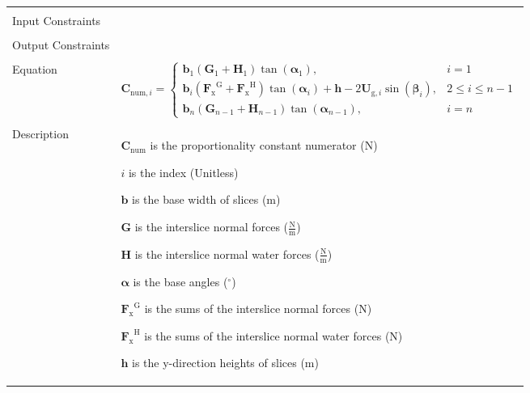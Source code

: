 \documentclass[12pt]{article}
\begin{document}
\begin{minipage}{\textwidth}
\begin{tabular}{>{\raggedright}p{}>{\raggedright\arraybackslash}p{}}
\\ \midrule \\
Input Constraints & 
\\ \midrule \\
Output Constraints & 
\\ \midrule \\
Equation & \begin{displaymath}
           {\mathbf{C}_{\text{num},i}}=\begin{cases}
                                       {\mathbf{b}}_{1} \left({\mathbf{G}}_{1}+{\mathbf{H}}_{1}\right) \tan\left({\mathbf{α}}_{1}\right), & i=1\\
                                       {\mathbf{b}}_{i} \left({{\mathbf{F}_{\text{x}}}^{\text{G}}}+{{\mathbf{F}_{\text{x}}}^{\text{H}}}\right) \tan\left({\mathbf{α}}_{i}\right)+\mathbf{h} -2 {\mathbf{U}_{\text{g},i}} \sin\left({\mathbf{β}}_{i}\right), & 2\leq{}i\leq{}n-1\\
                                       {\mathbf{b}}_{n} \left({\mathbf{G}}_{n-1}+{\mathbf{H}}_{n-1}\right) \tan\left({\mathbf{α}}_{n-1}\right), & i=n
                                       \end{cases}
           \end{displaymath}
\\ \midrule \\
Description & \begin{symbDescription}
              \item{${\mathbf{C}_{\text{num}}}$ is the proportionality constant numerator (N)}
              \item{$i$ is the index (Unitless)}
              \item{$\mathbf{b}$ is the base width of slices (m)}
              \item{$\mathbf{G}$ is the interslice normal forces ($\frac{\text{N}}{\text{m}}$)}
              \item{$\mathbf{H}$ is the interslice normal water forces ($\frac{\text{N}}{\text{m}}$)}
              \item{$\mathbf{α}$ is the base angles (${}^{\circ}$)}
              \item{${{\mathbf{F}_{\text{x}}}^{\text{G}}}$ is the sums of the interslice normal forces (N)}
              \item{${{\mathbf{F}_{\text{x}}}^{\text{H}}}$ is the sums of the interslice normal water forces (N)}
              \item{$\mathbf{h}$ is the y-direction heights of slices (m)}

\end{symbDescription}
\end{tabular}
\end{minipage}
\end{document}
